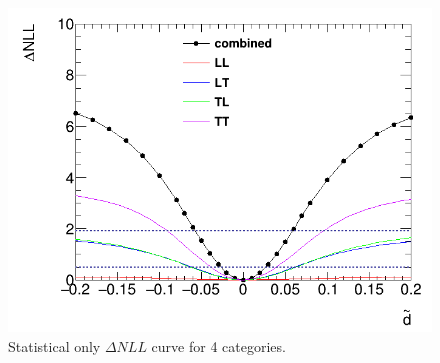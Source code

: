 \begin{figure}[h]
  \centering
  \includegraphics[width=.7\textwidth]{figure/nll_idvCats_syst.png}
  \caption{Statistical only $\Delta NLL$ curve for 4 categories. }
  \label{fig:NLLcurve_4cate}
\end{figure}



